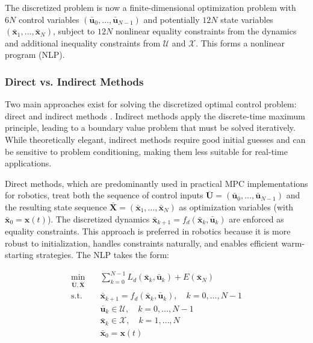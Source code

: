 The discretized problem is now a finite-dimensional optimization problem with $6N$ control variables $(\mathbf{\bar{u}}_0, \ldots, \mathbf{\bar{u}}_{N-1})$ and potentially $12N$ state variables $(\boldsymbol{\bar{x}}_1, \ldots, \boldsymbol{\bar{x}}_N)$, subject to $12N$ nonlinear equality constraints from the dynamics and additional inequality constraints from $\mathcal{U}$ and $\mathcal{X}$. This forms a nonlinear program (NLP).


\subsubsection{Direct vs. Indirect Methods}

Two main approaches exist for solving the discretized optimal control problem: direct and indirect methods \cite{betts2010practical}. Indirect methods apply the discrete-time maximum principle, leading to a boundary value problem that must be solved iteratively. While theoretically elegant, indirect methods require good initial guesses and can be sensitive to problem conditioning, making them less suitable for real-time applications.

Direct methods, which are predominantly used in practical MPC implementations for robotics, treat both the sequence of control inputs $\overline{\mathbf{U}} = (\mathbf{\bar{u}}_0, \dots, \mathbf{\bar{u}}_{N-1})$ and the resulting state sequence $\overline{\mathbf{X}} = (\boldsymbol{\bar{x}}_1, \dots, \boldsymbol{\bar{x}}_N)$ as optimization variables (with $\boldsymbol{\bar{x}}_0 = \boldsymbol{x}(t)$). The discretized dynamics $\boldsymbol{\bar{x}}_{k+1} = f_d(\boldsymbol{\bar{x}}_k, \mathbf{\bar{u}}_k)$ are enforced as equality constraints. This approach is preferred in robotics because it is more robust to initialization, handles constraints naturally, and enables efficient warm-starting strategies. The NLP takes the form:

\begin{equation}
\begin{aligned}
\min_{\overline{\mathbf{U}}, \overline{\mathbf{X}}} \quad & \sum_{k=0}^{N-1} L_d(\boldsymbol{\bar{x}}_k, \mathbf{\bar{u}}_k) + E(\boldsymbol{\bar{x}}_N) \\
\text{s.t.} \quad & \boldsymbol{\bar{x}}_{k+1} = f_d(\boldsymbol{\bar{x}}_k, \mathbf{\bar{u}}_k), \quad k=0, \dots, N-1 \\
& \mathbf{\bar{u}}_k \in \mathcal{U}, \quad k=0, \dots, N-1 \\
& \boldsymbol{\bar{x}}_k \in \mathcal{X}, \quad k=1, \dots, N \\
& \boldsymbol{\bar{x}}_0 = \boldsymbol{x}(t)
\end{aligned}
\end{equation}

